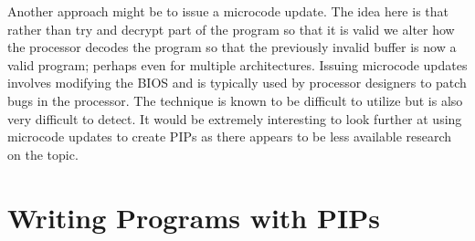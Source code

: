 \documentclass[10pt,]{book}
\begin{document}
Another approach might be to issue a microcode
update\autocite{Smotherman:2010wr}. The idea here is that rather than
try and decrypt part of the program so that it is valid we alter how the
processor decodes the program so that the previously invalid buffer is
now a valid program; perhaps even for multiple architectures. Issuing
microcode updates involves modifying the BIOS and is typically used by
processor designers to patch bugs in the processor. The technique is
known to be difficult to utilize\autocite{Skoudis:2004to} but is also
very difficult to detect. It would be extremely interesting to look
further at using microcode updates to create PIPs as there appears to be
less available research on the topic.

\section{Writing Programs with PIPs}
\end{document}
